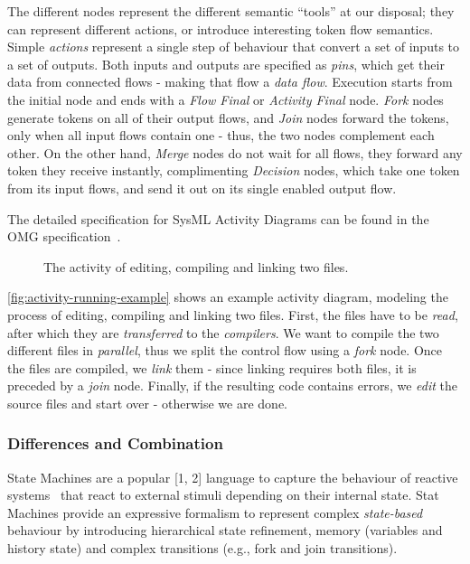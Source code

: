 The different nodes represent the different semantic ``tools'' at our disposal; they can represent different actions, or introduce interesting token flow semantics.
Simple \emph{actions} represent a single step of behaviour that convert a set of inputs to a set of outputs. Both inputs and outputs are specified as \emph{pins}, which get their data from connected flows - making that flow a \emph{data flow}. Execution starts from the initial node and ends with a \emph{Flow Final} or \emph{Activity Final} node. \emph{Fork} nodes generate tokens on all of their output flows, and \emph{Join} nodes forward the tokens, only when all input flows contain one - thus, the two nodes complement each other. On the other hand, \emph{Merge} nodes do not wait for all flows, they forward any token they receive instantly, complimenting \emph{Decision} nodes, which take one token from its input flows, and send it out on its single enabled output flow.

The detailed specification for SysML Activity Diagrams can be found in the OMG specification~\cite{omg_sysml}.

\begin{figure}[!ht]
	\centering
	
	\caption{The activity of editing, compiling and linking two files.}
	\label{fig:activity-running-example}
\end{figure}

\autoref{fig:activity-running-example} shows an example activity diagram, modeling the process of editing, compiling and linking two files. First, the files have to be \textsl{read}, after which they are \textsl{transferred} to the \emph{compilers}. We want to compile the two different files in \emph{parallel}, thus we split the control flow using a \textsl{fork} node. Once the files are compiled, we \textsl{link} them - since linking requires both files, it is preceded by a \emph{join} node. Finally, if the resulting code contains errors, we \textsl{edit} the source files and start over - otherwise we are done.

\iffalse
\subsubsection{Differences and Combination}

State Machines are a popular [1, 2] language to capture the behaviour
of reactive systems~\cite{HAREL1987231} that react to external stimuli depending on
their internal state. Stat Machines provide an expressive formalism to
represent complex \emph{state-based} behaviour by introducing hierarchical
state refinement, memory (variables and history state) and complex
transitions (e.g., fork and join transitions).

